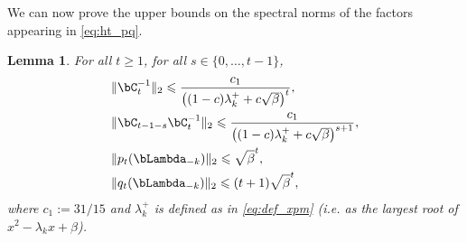 \documentclass{article}
\theoremstyle{plain}
\newtheorem{lemma}[theorem]{Lemma}
\theoremstyle{definition}
\theoremstyle{remark}
\begin{document}
We can now prove the upper bounds on the spectral norms of the factors appearing in \eqref{eq:ht_pq}.

\begin{lemma}\label{lemma:ctpt_bound}
  For all $t\geqslant 1$, for all $s \in \{0, \dots, t-1\}$,
  \begin{align*}
    & \Vert \bC_t^{-1} \Vert_2 \leqslant \frac{c_1}{\left((1-c)\lambda_k^+ + c\sqrt{\beta}\right)^t}, \\
    & \Vert \bC_{t-1-s}\bC_t^{-1} \Vert_2 \leqslant \frac{c_1}{\left((1-c)\lambda_k^+ + c\sqrt{\beta}\right)^{s+1}}, \\
    & \Vert p_t(\bLambda_{-k}) \Vert_2 \leqslant \sqrt{\beta}^t, \\
    & \Vert q_t(\bLambda_{-k}) \Vert_2 \leqslant (t+1) \sqrt{\beta}^t,
  \end{align*}
  where $c_1 := 31/15$ and $\lambda_k^+$ is defined as in \eqref{eq:def_xpm} (i.e. as the largest root of $x^2 - \lambda_k x + \beta$).
\end{lemma}
\end{document}
